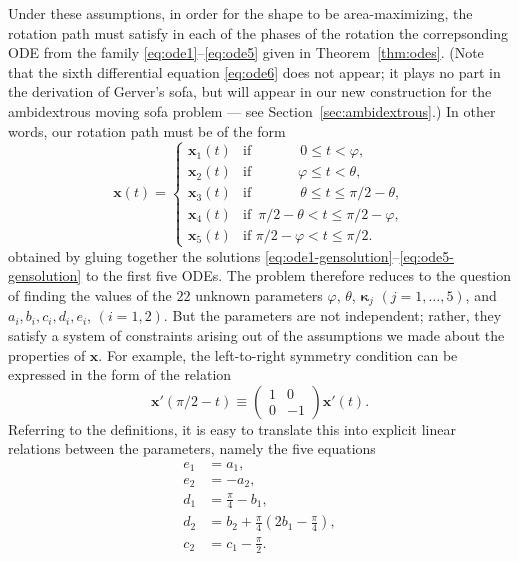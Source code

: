 \documentclass[11pt]{article}
\begin{document}
Under these assumptions, in order for the shape to be area-maximizing, the rotation path must satisfy in each of the phases of the rotation the correpsonding ODE from the family \eqref{eq:ode1}--\eqref{eq:ode5} given in Theorem~\ref{thm:odes}. (Note that the sixth differential equation \eqref{eq:ode6} does not appear; it plays no part in the derivation of Gerver's sofa, but will appear in our new construction for the ambidextrous moving sofa problem --- see Section~\ref{sec:ambidextrous}.) In other words, our rotation path must be of the form
\begin{equation}
\label{eq:gerverx-def}
\mathbf{x}(t) = \begin{cases}
\mathbf{x}_1(t) & \textrm{if }\phantom{\pi/2-\ \,}0\le t< \varphi, \\
\mathbf{x}_2(t) & \textrm{if }\phantom{\pi/2-\ }\varphi \le t < \theta, \\
\mathbf{x}_3(t) & \textrm{if }\phantom{\pi/2-\ \,}\theta \le t \le \pi/2-\theta, \\
\mathbf{x}_4(t) & \textrm{if }\, \pi/2-\theta < t \le \pi/2-\varphi, \\
\mathbf{x}_5(t) & \textrm{if }\pi/2-\varphi < t \le \pi/2.
\end{cases}
\end{equation}
obtained by gluing together the solutions \eqref{eq:ode1-gensolution}--\eqref{eq:ode5-gensolution} to the first five ODEs. The problem therefore reduces to the question of finding the values of the $22$ unknown parameters $\varphi$, $\theta$, $\boldsymbol{\kappa}_j$ $(j=1,\ldots,5)$, and $a_i, b_i, c_i, d_i, e_i$, $(i=1,2)$. But the parameters are not independent; rather, they satisfy a system of constraints arising out of the assumptions we made about the properties of $\mathbf{x}$. For example, the left-to-right symmetry condition can be expressed in the form of the relation
\begin{equation}
\mathbf{x}'(\pi/2-t) \equiv \begin{pmatrix} 1&0 \\ 0&-1 \end{pmatrix} \mathbf{x}'(t). \label{eq:gerver-symmetry}
\end{equation}
Referring to the definitions, it is easy to translate this into explicit linear relations between the parameters, namely the five equations
\begin{align}
e_1 &= a_1, \label{eq:gerver-coeffs-symmetry1} \\
e_2 &= -a_2, \label{eq:gerver-coeffs-symmetry2} \\
d_1 &= \frac{\pi}{4} - b_1, \label{eq:gerver-coeffs-symmetry3} \\
d_2 &= b_2 + \frac{\pi}{4}\left(2 b_1 - \frac{\pi}{4} \right), \label{eq:gerver-coeffs-symmetry4} \\
c_2 &= c_1-\frac{\pi}{2}. \label{eq:gerver-coeffs-symmetry5}
\end{align}
\end{document}
